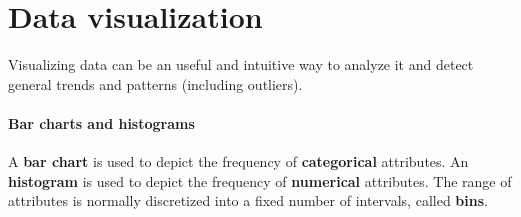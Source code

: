 
\section{Data visualization}

Visualizing data can be an useful and intuitive way to analyze it and detect general trends and patterns (including outliers).

\paragraph{Bar charts and histograms}

A \textbf{bar chart} is used to depict the frequency of \textbf{categorical} attributes. An \textbf{histogram} is used to depict the frequency of \textbf{numerical} attributes. The range of attributes is normally discretized into a fixed number of intervals, called \textbf{bins}.

